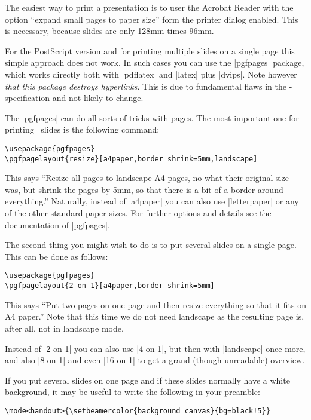 The easiest way to print a presentation is to user the Acrobat Reader
with the option ``expand small pages to paper size'' form the printer
dialog enabled. This is necessary, because slides are only 128mm times
96mm.

For the PostScript version and for printing multiple slides on a
single page this simple approach does not work. In such cases you can
use the |pgfpages| package, which works directly both with |pdflatex|
and |latex| plus |dvips|. Note however \emph{that this package
  destroys hyperlinks}. This is due to fundamental flaws in the
\pdf-specification and not likely to change.

The |pgfpages| can do all sorts of tricks with pages. The most
important one for printing \beamer\ slides is the following command:

\begin{verbatim}
\usepackage{pgfpages}
\pgfpagelayout{resize}[a4paper,border shrink=5mm,landscape]
\end{verbatim}

This says ``Resize all pages to landscape A4 pages, no what their
original size was, but shrink the pages by 5mm, so that there is a bit
of a border around everything.'' Naturally, instead of |a4paper| you
can also use |letterpaper| or any of the other standard paper
sizes. For further options and details see the documentation of
|pgfpages|.

The second thing you might wish to do is to put several slides on a
single page. This can be done as follows:

\begin{verbatim}
\usepackage{pgfpages}
\pgfpagelayout{2 on 1}[a4paper,border shrink=5mm]
\end{verbatim}

This says ``Put two pages on one page and then resize everything so
that it fits on A4 paper.'' Note that this time we do not need
landscape as the resulting page is, after all, not in landscape mode.

Instead of |2 on 1| you can also use |4 on 1|, but then with
|landscape| once more, and also |8 on 1| and even |16 on 1| to get a
grand (though unreadable) overview.

If you put several slides on one page and if these slides normally
have a white background, it may be useful to write the following in
your preamble: 

\begin{verbatim}
\mode<handout>{\setbeamercolor{background canvas}{bg=black!5}}
\end{verbatim}

